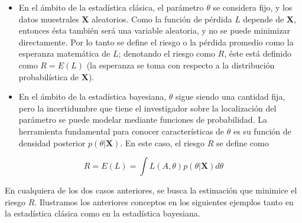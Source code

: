 \documentclass[
  spanish,
]{book}
\theoremstyle{definition}
\theoremstyle{definition}
\theoremstyle{definition}
\theoremstyle{remark}
\begin{document}
\begin{itemize}
\item
  En el ámbito de la estadística clásica, el parámetro \(\theta\) se considera fijo, y los datos muestrales \(\mathbf{X}\) aleatorios. Como la función de pérdida \(L\) depende de \(\mathbf{X}\), entonces ésta también será una variable aleatoria, y no se puede minimizar directamente. Por lo tanto se define el riesgo o la pérdida promedio como la esperanza matemática de \(L\); denotando el riesgo como \(R\), éste está definido como \(R=E(L)\) (la esperanza se toma con respecto a la distribución probabilística de \(\mathbf{X}\)).
\item
  En el ámbito de la estadística bayesiana, \(\theta\) sigue siendo una cantidad fija, pero la incertidumbre que tiene el investigador sobre la localización del parámetro se puede modelar mediante funciones de probabilidad. La herramienta fundamental para conocer características de \(\theta\) es su función de densidad posterior \(p(\theta|\mathbf{X})\). En este caso, el riesgo \(R\) se define como
\end{itemize}

\begin{equation*}
R=E(L)=\int L(A, \theta)p(\theta|\mathbf{X})d\theta
\end{equation*}

En cualquiera de los dos casos anteriores, se busca la estimación que minimice el riesgo \(R\). Ilustramos los anteriores conceptos en los siguientes ejemplos tanto en la estadística clásica como en la estadística bayesiana.
\end{document}
